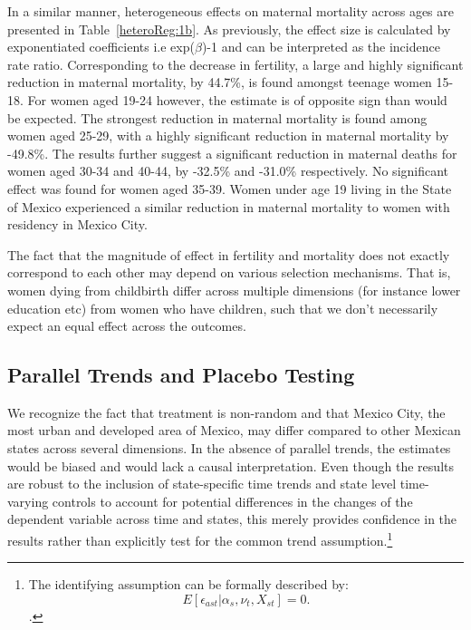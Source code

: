 \documentclass[a4paper, 11pt]{article}
\begin{document}
\begin{spacing}{2}
In a similar manner, heterogeneous effects on maternal mortality across ages are presented in Table~\ref{heteroReg:1b}. As previously, the effect size is calculated by exponentiated coefficients i.e exp($\beta$)-1 and can be interpreted as the incidence rate ratio. Corresponding to the decrease in fertility, a large and highly significant reduction in maternal mortality, by 44.7\%, is found amongst teenage women 15-18. For women aged 19-24 however, the estimate is of opposite sign than would be expected. The strongest reduction in maternal mortality is found among women aged 25-29, with a highly significant reduction in maternal mortality by -49.8\%. The results further suggest a significant reduction in maternal deaths for women aged 30-34 and 40-44, by -32.5\% and -31.0\% respectively. No significant effect was found for women aged 35-39. Women under age 19 living in the State of Mexico experienced a similar reduction in maternal mortality to women with residency in Mexico City.  

The fact that the magnitude of effect in fertility and mortality does not exactly correspond to each other may depend on various selection mechanisms. That is, women dying from childbirth differ across multiple dimensions (for instance lower education etc) from women who have children, such that we don't necessarily expect an equal effect across the outcomes. 



\subsection{Parallel Trends and Placebo Testing}\label{parallel}



We recognize the fact that treatment is non-random and that Mexico City, the most urban and developed area of Mexico, may differ compared to other Mexican states across several dimensions. In the absence of parallel trends, the estimates would be biased and would lack a causal interpretation. Even though the results are robust to the inclusion of state-specific time trends and state level time-varying controls to account for potential differences in the changes of the dependent variable across time and states, this merely provides confidence in the results rather than explicitly test for the common trend assumption.\footnote{The identifying assumption can be formally described by:  
	\begin{equation*}
	E[\epsilon_{ast}|\alpha_{s},\nu_{t},X_{st}]=0.
	\end{equation*}.}


\end{spacing}
\end{document}

